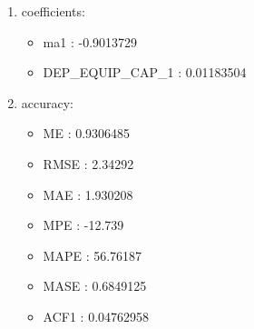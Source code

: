 \documentclass[10pt,a4paper]{article}\usepackage[]{graphicx}\usepackage[]{color}
\newcommand{\AaA}{\_}
\begin{document}
\begin{multicols}{2}
\begin{enumerate}
\item coefficients:
\begin{itemize}
\item  ma1 :  -0.9013729 
\item  DEP\AaA EQUIP\AaA CAP\AaA 1 :  0.01183504 
\end{itemize}
\item accuracy:
\begin{itemize}
\item  ME :  0.9306485 
\item  RMSE :  2.34292 
\item  MAE :  1.930208 
\item  MPE :  -12.739 
\item  MAPE :  56.76187 
\item  MASE :  0.6849125 
\item  ACF1 :  0.04762958 
\end{itemize}
\end{enumerate}
\end{multicols}
\end{document}

